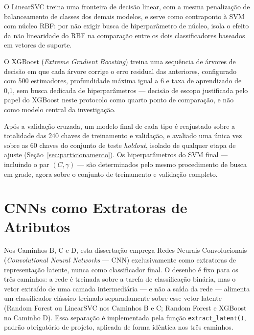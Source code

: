 O LinearSVC treina uma fronteira de decisão linear, com a mesma penalização de balanceamento de classes dos demais modelos, e serve como contraponto à SVM com núcleo RBF: por não exigir busca de hiperparâmetro de núcleo, isola o efeito da não linearidade do RBF na comparação entre os dois classificadores baseados em vetores de suporte.

O XGBoost (\emph{Extreme Gradient Boosting}) treina uma sequência de árvores de decisão em que cada árvore corrige o erro residual das anteriores, configurado com 500 estimadores, profundidade máxima igual a 6 e taxa de aprendizado de 0,1, sem busca dedicada de hiperparâmetros --- decisão de escopo justificada pelo papel do XGBoost neste protocolo como quarto ponto de comparação, e não como modelo central da investigação.

Após a validação cruzada, um modelo final de cada tipo é reajustado sobre a totalidade das 240 chaves de treinamento e validação, e avaliado uma única vez sobre as 60 chaves do conjunto de teste \emph{holdout}, isolado de qualquer etapa de ajuste (Seção~\ref{sec:particionamento}). Os hiperparâmetros do SVM final --- incluindo o par $(C,\gamma)$ --- são determinados pelo mesmo procedimento de busca em grade, agora sobre o conjunto de treinamento e validação completo.

\section{CNNs como Extratoras de Atributos}
\label{sec:cnn-extratoras}

Nos Caminhos B, C e D, esta dissertação emprega Redes Neurais Convolucionais (\emph{Convolutional Neural Networks} --- CNN) exclusivamente como extratoras de representação latente, nunca como classificador final. O desenho é fixo para os três caminhos: a rede é treinada sobre a tarefa de classificação binária, mas o vetor extraído de uma camada intermediária --- e não a saída da rede --- alimenta um classificador clássico treinado separadamente sobre esse vetor latente (Random Forest ou LinearSVC nos Caminhos B e C; Random Forest e XGBoost no Caminho D). Essa separação é implementada pela função \texttt{extract\_latent()}, padrão obrigatório de projeto, aplicada de forma idêntica nos três caminhos.

